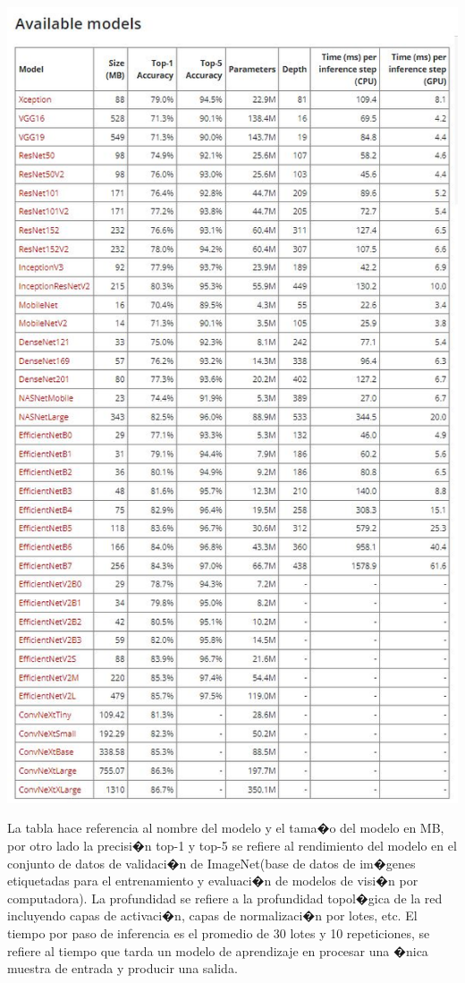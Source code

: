 \documentclass[12pt,letterpaper]{article}
\begin{document}
\begin{center}
  \includegraphics[scale=0.8]{imagenes/modelos_keras}
 \label{fig:Keras} 
\end{center} 

La tabla hace referencia al nombre del modelo y el tama�o del modelo en MB, por otro lado la precisi�n top-1 y top-5 se refiere al rendimiento del modelo en el conjunto de datos de validaci�n de ImageNet(base de datos de im�genes etiquetadas para el entrenamiento y evaluaci�n de modelos de visi�n por computadora). La profundidad se refiere a la profundidad topol�gica de la red incluyendo capas de activaci�n, capas de normalizaci�n por lotes, etc. El tiempo por paso de inferencia es el promedio de 30 lotes y 10 repeticiones, se refiere al tiempo que tarda un modelo de aprendizaje en procesar una �nica muestra de entrada y producir una salida. 
\end{document}
